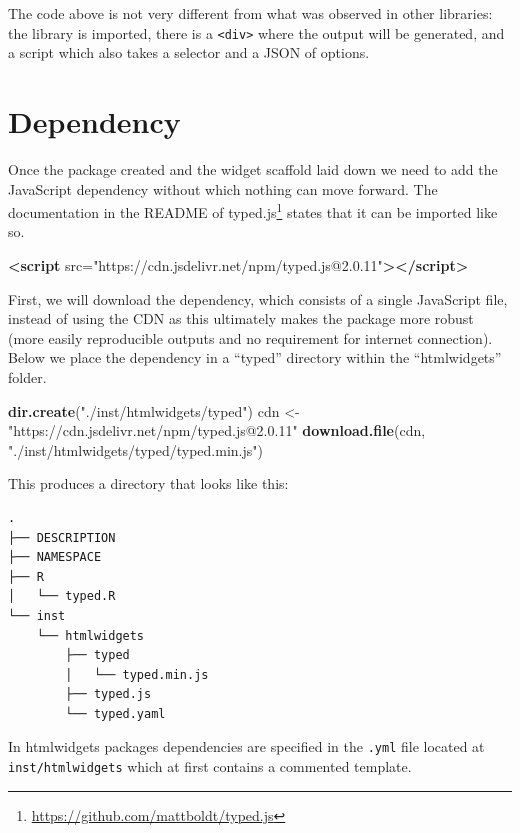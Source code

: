 \documentclass[
]{krantz}
\makeatletter
\newenvironment{Shaded}{\begin{snugshade}}{\end{snugshade}}
\newcommand{\KeywordTok}[1]{\textcolor[rgb]{0.27,0.27,0.27}{\textbf{#1}}}
\newcommand{\NormalTok}[1]{#1}
\newcommand{\OtherTok}[1]{\textcolor[rgb]{0.37,0.37,0.37}{#1}}
\newcommand{\StringTok}[1]{\textcolor[rgb]{0.5,0.5,0.5}{#1}}
\renewcommand{\href}[2]{#2\footnote{\url{#1}}}
\newenvironment{kframe}{%
\medskip{}
\setlength{\fboxsep}{.8em}
 \def\at@end@of@kframe{}%
 \ifinner\ifhmode%
  \def\at@end@of@kframe{\end{minipage}}%
  \begin{minipage}{\columnwidth}%
 \fi\fi%
 \def\FrameCommand##1{\hskip\@totalleftmargin \hskip-\fboxsep
 \colorbox{shadecolor}{##1}\hskip-\fboxsep
     \hskip-\linewidth \hskip-\@totalleftmargin \hskip\columnwidth}%
 \MakeFramed {\advance\hsize-\width
   \@totalleftmargin\z@ \linewidth\hsize
   \@setminipage}}%
 {\par\unskip\endMakeFramed%
 \at@end@of@kframe}
\renewenvironment{Shaded}{\begin{kframe}}{\end{kframe}}
\makeatother
\begin{document}
The code above is not very different from what was observed in other libraries: the library is imported, there is a \texttt{\textless{}div\textgreater{}} where the output will be generated, and a script which also takes a selector and a JSON of options.

\hypertarget{dependency}{%
\section{Dependency}\label{dependency}}

Once the package created and the widget scaffold laid down we need to add the JavaScript dependency without which nothing can move forward. The \href{https://github.com/mattboldt/typed.js}{documentation in the README of typed.js} states that it can be imported like so.

\begin{Shaded}
\begin{Highlighting}[]
\KeywordTok{<script}\OtherTok{ src=}\StringTok{"https://cdn.jsdelivr.net/npm/typed.js@2.0.11"}\KeywordTok{></script>}
\end{Highlighting}
\end{Shaded}

First, we will download the dependency, which consists of a single JavaScript file, instead of using the CDN as this ultimately makes the package more robust (more easily reproducible outputs and no requirement for internet connection). Below we place the dependency in a ``typed'' directory within the ``htmlwidgets'' folder.

\begin{Shaded}
\begin{Highlighting}[]
\KeywordTok{dir.create}\NormalTok{(}\StringTok{"./inst/htmlwidgets/typed"}\NormalTok{)}
\NormalTok{cdn <{-}}\StringTok{ "https://cdn.jsdelivr.net/npm/typed.js@2.0.11"}
\KeywordTok{download.file}\NormalTok{(cdn, }\StringTok{"./inst/htmlwidgets/typed/typed.min.js"}\NormalTok{)}
\end{Highlighting}
\end{Shaded}

This produces a directory that looks like this:

\begin{verbatim}
.
├── DESCRIPTION
├── NAMESPACE
├── R
│   └── typed.R
└── inst
    └── htmlwidgets
        ├── typed
        │   └── typed.min.js
        ├── typed.js
        └── typed.yaml
\end{verbatim}

In htmlwidgets packages dependencies are specified in the \texttt{.yml} file located at \texttt{inst/htmlwidgets} which at first contains a commented template.
\end{document}
